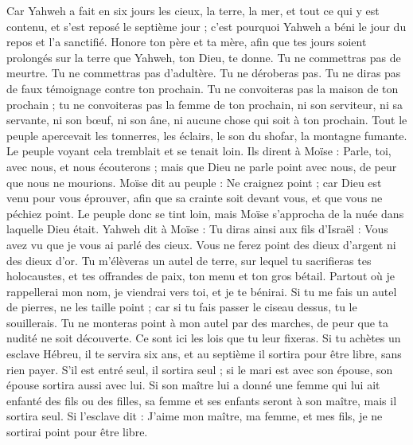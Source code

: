 \begin{multicols}{2}
Car Yahweh a fait en six jours les cieux, la terre, la mer, et tout ce qui y est contenu, et s'est reposé le septième jour ; c'est pourquoi Yahweh a béni le jour du repos et l’a sanctifié.
Honore ton père et ta mère, afin que tes jours soient prolongés sur la terre que Yahweh, ton Dieu, te donne.
Tu ne commettras pas de meurtre.
Tu ne commettras pas d’adultère.
Tu ne déroberas pas.
Tu ne diras pas de faux témoignage contre ton prochain.
Tu ne convoiteras pas la maison de ton prochain ; tu ne convoiteras pas la femme de ton prochain, ni son serviteur, ni sa servante, ni son bœuf, ni son âne, ni aucune chose qui soit à ton prochain.
Tout le peuple apercevait les tonnerres, les éclairs, le son du shofar, la montagne fumante. Le peuple voyant cela tremblait et se tenait loin.
Ils dirent à Moïse : Parle, toi, avec nous, et nous écouterons ; mais que Dieu ne parle point avec nous, de peur que nous ne mourions.
Moïse dit au peuple : Ne craignez point ; car Dieu est venu pour vous éprouver, afin que sa crainte soit devant vous, et que vous ne péchiez point.
Le peuple donc se tint loin, mais Moïse s'approcha de la nuée dans laquelle Dieu était.
Yahweh dit à Moïse : Tu diras ainsi aux fils d'Israël : Vous avez vu que je vous ai parlé des cieux.
Vous ne ferez point des dieux d'argent ni des dieux d'or.
Tu m’élèveras un autel de terre, sur lequel tu sacrifieras tes holocaustes, et tes offrandes de paix, ton menu et ton gros bétail. Partout où je rappellerai mon nom, je viendrai vers toi, et je te bénirai.
Si tu me fais un autel de pierres, ne les taille point ; car si tu fais passer le ciseau dessus, tu le souillerais.
Tu ne monteras point à mon autel par des marches, de peur que ta nudité ne soit découverte.
\VerseOne{}Ce sont ici les lois que tu leur fixeras.
Si tu achètes un esclave Hébreu, il te servira six ans, et au septième il sortira pour être libre, sans rien payer.
S'il est entré seul, il sortira seul ; si le mari est avec son épouse, son épouse sortira aussi avec lui.
Si son maître lui a donné une femme qui lui ait enfanté des fils ou des filles, sa femme et ses enfants seront à son maître, mais il sortira seul.
Si l'esclave dit : J'aime mon maître, ma femme, et mes fils, je ne sortirai point pour être libre.

\end{multicols}
